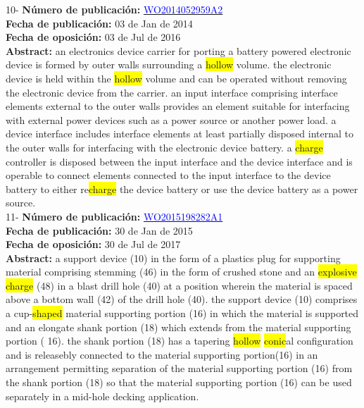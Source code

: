  \vspace{1cm}10- \textbf{Número de publicación:} \href{https://worldwide.espacenet.com/publicationDetails/biblio?DB=EPODOC&II=0&ND=3&adjacent=true&locale=en_EP&FT=D&date=20160331&CC=WO&NR=2014052959A2&KC=A2#}{\textcolor{blue}{WO2014052959A2}}\\ 
\textbf{Fecha de publicación:} 03 de Jan de 2014\\ 
\textbf{Fecha de oposición:} 03 de Jul de 2016\\ 
\textbf{Abstract:} an electronics device carrier for porting a battery powered electronic device is formed by outer walls surrounding a \colorbox{yellow}{\colorbox{yellow}{hollow}} volume. the electronic device is held within the \colorbox{yellow}{\colorbox{yellow}{hollow}} volume and can be operated without removing the electronic device from the carrier. an input interface comprising interface elements external to the outer walls provides an element suitable for interfacing with external power devices such as a power source or another power load. a device interface includes interface elements at least partially disposed internal to the outer walls for interfacing with the electronic device battery. a \colorbox{yellow}{\colorbox{yellow}{charge}} controller is disposed between the input interface and the device interface and is operable to connect elements connected to the input interface to the device battery to either re\colorbox{yellow}{\colorbox{yellow}{charge}} the device battery or use the device battery as a power source.\\ 
 

 \vspace{1cm}11- \textbf{Número de publicación:} \href{https://worldwide.espacenet.com/publicationDetails/biblio?DB=EPODOC&II=0&ND=3&adjacent=true&locale=en_EP&FT=D&date=20160331&CC=WO&NR=2015198282A1&KC=A1#}{\textcolor{blue}{WO2015198282A1}}\\ 
\textbf{Fecha de publicación:} 30 de Jan de 2015\\ 
\textbf{Fecha de oposición:} 30 de Jul de 2017\\ 
\textbf{Abstract:} a support device (10) in the form of a plastics plug for supporting material comprising stemming (46) in the form of crushed stone and an \colorbox{yellow}{explosive} \colorbox{yellow}{\colorbox{yellow}{charge}} (48) in a blast drill hole (40) at a position wherein the material is spaced above a bottom wall (42) of the drill hole (40). the support device (10) comprises a cup-\colorbox{yellow}{shaped} material supporting portion (16) in which the material is supported and an elongate shank portion (18) which extends from the material supporting portion ( 16). the shank portion (18) has a tapering \colorbox{yellow}{\colorbox{yellow}{hollow}} \colorbox{yellow}{conic}al configuration and is releasebly connected to the material supporting portion(16) in an arrangement permitting separation of the material supporting portion (16) from the shank portion (18) so that the material supporting portion (16) can be used separately in a mid-hole decking application.\\ 
 
